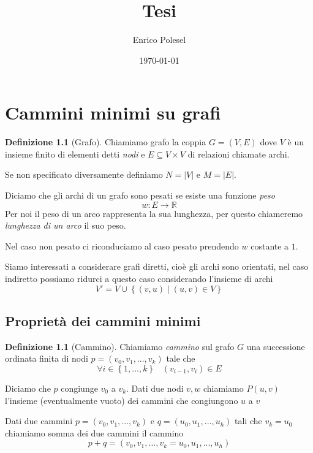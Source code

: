 \documentclass[a4paper,10pt]{amsbook}
\title{Tesi}
\author{Enrico Polesel}
\date{\today}
\newcounter{counter1}
\theoremstyle{plain}
\theoremstyle{definition}
\newtheorem{mydef}[counter1]{Definizione}
\theoremstyle{remark}
\newcommand{\set}[1]{\left\{#1\right\}}
\newcommand{\abs}[1]{\left|#1\right|}
\begin{document}
\maketitle

\setcounter{tocdepth}{5}



\tableofcontents

\chapter{Cammini minimi su grafi}

\begin{mydef}[Grafo]
  Chiamiamo grafo la coppia $G = (V,E)$ dove $V$ è un insieme finito
  di elementi detti \textit{nodi} e $E\subseteq V \times V$ di
  relazioni chiamate archi.
\end{mydef}

Se non specificato diversamente definiamo $N = \abs{V}$ e $M =
\abs{E}$.

Diciamo che gli archi di un grafo sono pesati se esiste una funzione
\textit{peso}
\[ w : E \rightarrow \mathbb{R} \]
Per noi il peso di un arco rappresenta la sua lunghezza, per questo
chiameremo \textit{lunghezza di un arco} il suo peso.

Nel caso non pesato ci riconduciamo al caso pesato prendendo $w$
costante a $1$.

Siamo interessati a considerare grafi diretti, cioè gli archi sono
orientati, nel caso indiretto possiamo ridurci a questo caso
considerando l'insieme di archi 
\[ V' = V \cup \set{ (v,u) \mid (u,v) \in V } \]

\section{Proprietà dei cammini minimi}

\begin{mydef}[Cammino]
  Chiamiamo \textit{cammino} sul grafo $G$ una successione ordinata
  finita di nodi $p = ( v_0, v_1, ..., v_k)$ tale che 
  \[ \forall i \in \set{ 1, ... , k} \;\;\; (v_{i-1}, v_{i} ) \in E\]
\end{mydef}

Diciamo che $p$ congiunge $v_0$ a $v_k$. Dati due nodi $v,w$ chiamiamo
$P(u,v)$ l'insieme (eventualmente vuoto) dei cammini che congiungono
$u$ a $v$

Dati due cammini $p = ( v_0, v_1, ..., v_k)$ e $q = ( u_0, u_1, ...,
u_{h})$ tali che $v_k = u_0$ chiamiamo somma dei due cammini il
cammino
\[ p+q = ( v_0, v_1, ..., v_k= u_0, u_1, ..., u_{h}) \]
\end{document}
